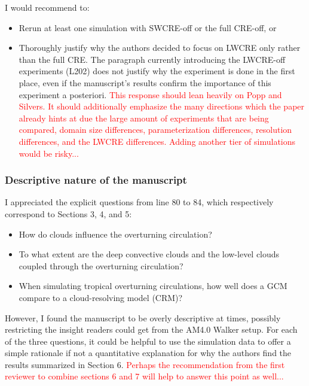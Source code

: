 \documentclass[draft]{agujournal2019}
\begin{document}
I would recommend to:

\begin{itemize}
  \item Rerun at least one simulation with SWCRE-off or the full CRE-off, or
  \item Thoroughly justify why the authors decided to focus on LWCRE only rather than the full CRE. The paragraph
currently introducing the LWCRE-off experiments (L202) does not justify why the experiment is done in the first
place, even if the manuscript’s results confirm the importance of this experiment a posteriori.
\textcolor{red}{This response should lean heavily on Popp and Silvers.  It should additionally emphasize the many directions which the paper already hints at due the large amount of experiments that are being compared, domain size differences, 
parameterization differences, resolution differences, and the LWCRE differences.  Adding another tier of simulations would 
be risky...}
\end{itemize}

\subsubsection{Descriptive nature of the manuscript}

I appreciated the explicit questions from line 80 to 84, which respectively correspond to Sections 3, 4, and 5:

\begin{itemize}
  \item How do clouds influence the overturning circulation?
  \item To what extent are the deep convective clouds and the low-level clouds coupled through the overturning circulation?
  \item When simulating tropical overturning circulations, how well does a GCM compare to a cloud-resolving model (CRM)?
\end{itemize}

However, I found the manuscript to be overly descriptive at times, possibly restricting the insight readers could get from
the AM4.0 Walker setup. For each of the three questions, it could be helpful to use the simulation data to offer a simple
rationale if not a quantitative explanation for why the authors find the results summarized in Section 6.  
\textcolor{red}{Perhaps the recommendation from the first reviewer to combine sections 6 and 7 will help to answer this point as well...}
\end{document}

